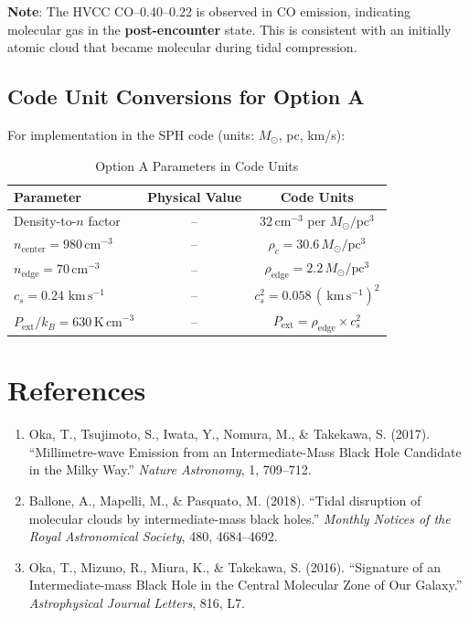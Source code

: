\documentclass[11pt,a4paper]{article}
\newcommand{\Msun}{M_\odot}
\newcommand{\kms}{\,\mathrm{km\,s^{-1}}}
\begin{document}
\textbf{Note}: The HVCC CO--0.40--0.22 is observed in CO emission, indicating molecular gas
in the \textbf{post-encounter} state. This is consistent with an initially atomic cloud
that became molecular during tidal compression.

\subsection{Code Unit Conversions for Option A}

For implementation in the SPH code (units: $\Msun$, pc, km/s):

\begin{table}[h]
\centering
\caption{Option A Parameters in Code Units}
\begin{tabular}{lcc}
\toprule
\textbf{Parameter} & \textbf{Physical Value} & \textbf{Code Units} \\
\midrule
Density-to-$n$ factor & -- & $32\,\mathrm{cm}^{-3}$ per $\Msun/\mathrm{pc}^3$ \\
$n_\mathrm{center} = 980\,\mathrm{cm}^{-3}$ & -- & $\rho_c = 30.6\,\Msun/\mathrm{pc}^3$ \\
$n_\mathrm{edge} = 70\,\mathrm{cm}^{-3}$ & -- & $\rho_\mathrm{edge} = 2.2\,\Msun/\mathrm{pc}^3$ \\
$c_s = 0.24\,\kms$ & -- & $c_s^2 = 0.058\,(\kms)^2$ \\
$P_\mathrm{ext}/k_B = 630\,\mathrm{K\,cm}^{-3}$ & -- & $P_\mathrm{ext} = \rho_\mathrm{edge} \times c_s^2$ \\
\bottomrule
\end{tabular}
\end{table}

\section{References}

\begin{enumerate}
    \item Oka, T., Tsujimoto, S., Iwata, Y., Nomura, M., \& Takekawa, S. (2017).
    ``Millimetre-wave Emission from an Intermediate-Mass Black Hole Candidate in the Milky Way.''
    \textit{Nature Astronomy}, 1, 709--712.
    \item Ballone, A., Mapelli, M., \& Pasquato, M. (2018).
    ``Tidal disruption of molecular clouds by intermediate-mass black holes.''
    \textit{Monthly Notices of the Royal Astronomical Society}, 480, 4684--4692.
    \item Oka, T., Mizuno, R., Miura, K., \& Takekawa, S. (2016).
    ``Signature of an Intermediate-mass Black Hole in the Central Molecular Zone of Our Galaxy.''
    \textit{Astrophysical Journal Letters}, 816, L7.
\end{enumerate}
\end{document}
